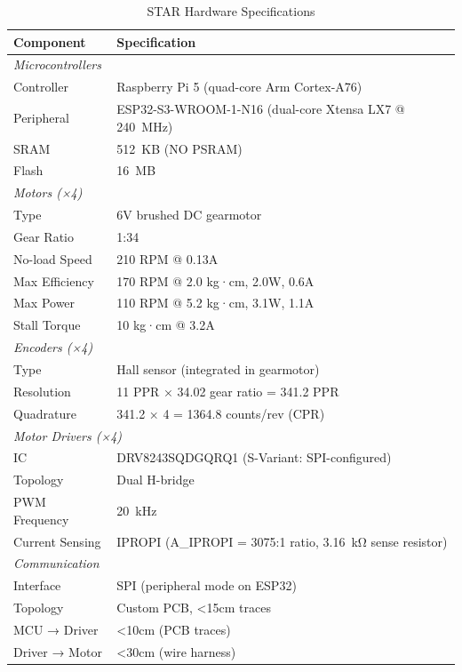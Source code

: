 \begin{table}[H]
\centering
\caption{STAR Hardware Specifications}
\begin{tabular}{ll}
\toprule
\textbf{Component} & \textbf{Specification} \\
\midrule
\multicolumn{2}{l}{\textit{Microcontrollers}} \\
Controller & Raspberry Pi 5 (quad-core Arm Cortex-A76) \\
Peripheral & ESP32-S3-WROOM-1-N16 (dual-core Xtensa LX7 @ 240~MHz) \\
SRAM & 512~KB (NO PSRAM) \\
Flash & 16~MB \\
\midrule
\multicolumn{2}{l}{\textit{Motors (×4)}} \\
Type & 6V brushed DC gearmotor \\
Gear Ratio & 1:34 \\
No-load Speed & 210 RPM @ 0.13A \\
Max Efficiency & 170 RPM @ 2.0 kg·cm, 2.0W, 0.6A \\
Max Power & 110 RPM @ 5.2 kg·cm, 3.1W, 1.1A \\
Stall Torque & 10 kg·cm @ 3.2A \\
\midrule
\multicolumn{2}{l}{\textit{Encoders (×4)}} \\
Type & Hall sensor (integrated in gearmotor) \\
Resolution & 11 PPR × 34.02 gear ratio = 341.2 PPR \\
Quadrature & 341.2 × 4 = 1364.8 counts/rev (CPR) \\
\midrule
\multicolumn{2}{l}{\textit{Motor Drivers (×4)}} \\
IC & DRV8243SQDGQRQ1 (S-Variant: SPI-configured) \\
Topology & Dual H-bridge \\
PWM Frequency & 20~kHz \\
Current Sensing & IPROPI (A\_IPROPI = 3075:1 ratio, 3.16~kΩ sense resistor) \\
\midrule
\multicolumn{2}{l}{\textit{Communication}} \\
Interface & SPI (peripheral mode on ESP32) \\
Topology & Custom PCB, <15cm traces \\
MCU → Driver & <10cm (PCB traces) \\
Driver → Motor & <30cm (wire harness) \\
\bottomrule
\end{tabular}
\end{table}

